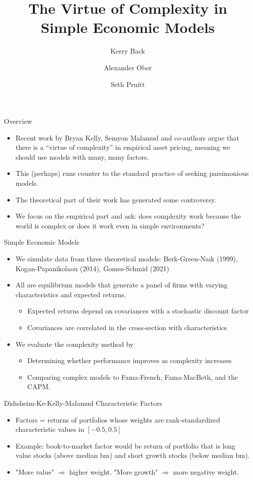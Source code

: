 \documentclass[aspectratio=169]{beamer}
\title{The Virtue of Complexity in Simple Economic Models}
\author{Kerry Back \and Alexander Ober \and Seth Pruitt}
\date{}
\begin{document}
\begin{frame}
  \titlepage
\end{frame}

\begin{frame}{Overview}

  \begin{itemize}
    \item Recent work by Bryan Kelly, Semyon Malamud and co-authors argue that there is a ``virtue of complexity'' in empirical asset pricing, meaning we should use models with many, many factors.
    \item This (perhaps) runs counter to the standard practice of seeking parsimonious models. 
    \item The theoretical part of their work has generated some controversy.
    \item We focus on the empirical part and ask: does complexity work because the world is complex or does it work even in simple environments?
  \end{itemize}
\end{frame}

\begin{frame}{Simple Economic Models}
\begin{itemize}
\item We simulate data from three theoretical models: Berk-Green-Naik (1999), Kogan-Papanikolaou (2014), Gomes-Schmid (2021)
\item All are equilibrium models that generate a panel of firms with varying characteristics and expected returns.
\begin{itemize}
\item Expected returns depend on covariances with a stochastic discount factor
\item Covariances are correlated in the cross-section with characteristics
\end{itemize}
\item We evaluate the complexity method by
\begin{itemize}
\item Determining whether performance improves as complexity increases
\item Comparing complex models to Fama-French, Fama-MacBeth, and the CAPM.
\end{itemize}
\end{itemize}
\end{frame}


\begin{frame}{Didisheim-Ke-Kelly-Malamud Characteristic Factors}

\begin{itemize}
  \item Factors = returns of portfolios whose weights are rank-standardized characteristic values in $[-0.5, 0.5]$
  \item Example: book-to-market factor would be return of portfolio that is long value stocks (above median bm) and short growth stocks (below median bm).
  \item "More value" $\Rightarrow$ higher weight.  "More growth" $\Rightarrow$ more negative weight.
\end{itemize}
\end{frame}
\end{document}
